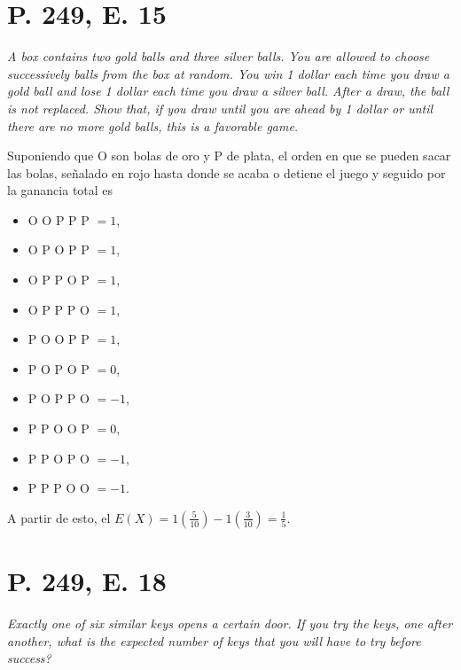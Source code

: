 \documentclass[paper=leter, fontsize=11pt]{scrartcl}
\numberwithin{equation}{section}		%
\numberwithin{figure}{section}			%
\numberwithin{table}{section}				%
\begin{document}
\section*{P. 249, E. 15}
\emph{A box contains two gold balls and three silver balls. You are allowed to choose successively balls from the box at random. You win 1 dollar each time you draw a gold ball and lose 1 dollar each time you draw a silver ball. After a draw, the ball is not replaced. Show that, if you draw until you are ahead by 1 dollar or until there are no more gold balls, this is a favorable game.}

Suponiendo que O son bolas de oro y P de plata, el orden en que se pueden sacar las bolas, señalado en rojo hasta donde se acaba o detiene el juego y seguido por la ganancia total es
\begin{itemize}
    \item \color{red}O \color{black} O P P P $= 1$,
    \item \color{red}O \color{black} P O P P $= 1$,
    \item \color{red}O \color{black} P P O P $= 1$,
    \item \color{red}O \color{black} P P P O $= 1$,
    \item \color{red}P O O \color{black} P P $= 1$,
    \item \color{red}P O P O \color{black} P $= 0$,
    \item \color{red}P O P P O \color{black} $= -1$,
    \item \color{red}P P O O \color{black} P $= 0$,
    \item \color{red}P P O P O \color{black} $= -1$,
    \item \color{red}P P P O O \color{black} $= -1$.
\end{itemize}

A partir de esto, el $E(X) = 1 (\frac{5}{10}) -1 (\frac{3}{10}) = \frac{1}{5}$.

\section*{P. 249, E. 18}
\emph{Exactly one of six similar keys opens a certain door. If you try the keys, one after another, what is the expected number of keys that you will have to try before success?}
\end{document}

